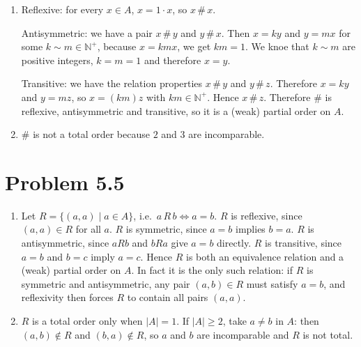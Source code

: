 \documentclass[12pt]{article}
\begin{document}
\begin{enumerate}[label=\alph*)]
\begin{center}
\end{center}
\item Reflexive: for every $x\in A$, $x=1\cdot x$, so $x\,\#\,x$.

Antisymmetric: we have a pair $x\,\#\,y$ and $y\,\#\,x$. Then $x=ky$ and $y=mx$ for some
$k\sim m\in\mathbb{N}^{+}$, because $x=kmx$, we get $km=1$. We knoe that $k\sim m$ are positive integers,
$k=m=1$ and therefore $x=y$.

Transitive: we have the relation properties $x\,\#\,y$ and $y\,\#\,z$. Therefore $x=ky$ and $y=mz$, so
$x=(km)z$ with $km\in\mathbb{N}^{+}$. Hence $x\,\#\,z$.
Therefore $\#$ is reflexive, antisymmetric and transitive, so it is a (weak) partial order on $A$.
\item $\#$ is not a total order because $2$ and $3$ are incomparable.
\end{enumerate}

\section*{Problem 5.5}
\begin{enumerate}[label=\alph*)]
    \item Let $R=\{(a,a)\mid a\in A\}$, i.e.\ $a\,R\,b \iff a=b$.
$R$ is reflexive, since $(a,a)\in R$ for all $a$.
$R$ is symmetric, since $a=b$ implies $b=a$.
$R$ is antisymmetric, since $aRb$ and $bRa$ give $a=b$ directly.
$R$ is transitive, since $a=b$ and $b=c$ imply $a=c$.
Hence $R$ is both an equivalence relation and a (weak) partial order on $A$.
In fact it is the only such relation: if $R$ is symmetric and antisymmetric,
any pair $(a,b)\in R$ must satisfy $a=b$, and reflexivity then forces $R$ to
contain all pairs $(a,a)$.
\item $R$ is a total order only when $|A|=1$. If $|A|\ge 2$, take $a\neq b$ in $A$:
then $(a,b)\notin R$ and $(b,a)\notin R$, so $a$ and $b$ are incomparable and $R$ is not total.
\end{enumerate}
\end{document}

